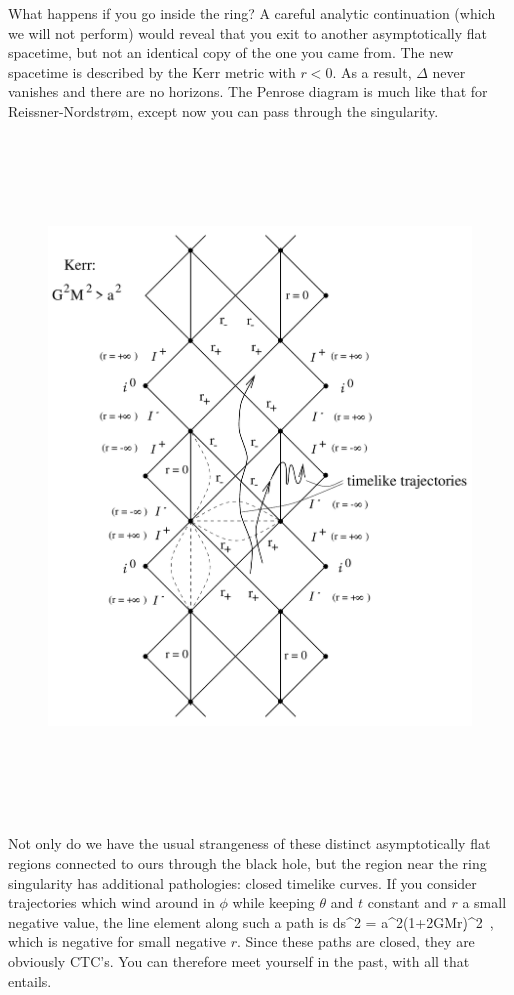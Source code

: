 \documentclass[12pt]{article}
\begin{document}
What happens if you go inside the ring?  A careful analytic
continuation (which we will not perform) would reveal that you
exit to another asymptotically flat spacetime, but not an identical
copy of the one you came from.  The new spacetime is described
by the Kerr metric with $r<0$.  As a result, $\Delta$ never vanishes
and there are no horizons.  The Penrose diagram is much like that for
Reissner-Nordstr{\o}m, except now you can pass through the singularity.

\begin{figure}[p]
  \centerline{
  \includegraphics[height=18cm]{pdf/seven34}}
\end{figure}

Not only do we have the usual strangeness of these distinct 
asymptotically flat regions connected to ours through the black
hole, but the region near the ring singularity has additional
pathologies: closed timelike curves.  If you consider trajectories
which wind around in $\phi$ while keeping $\theta$ and $t$
constant and $r$ a small negative value, the line element along such
a path is
\be
  ds^2 = a^2\left(1+{{2GM}\over r}\right)\d\phi^2\ ,\label{7.130}
\ee
which is negative for small negative $r$.  Since these paths are
closed, they are obviously CTC's.  You can therefore meet yourself
in the past, with all that entails.
\end{document}
